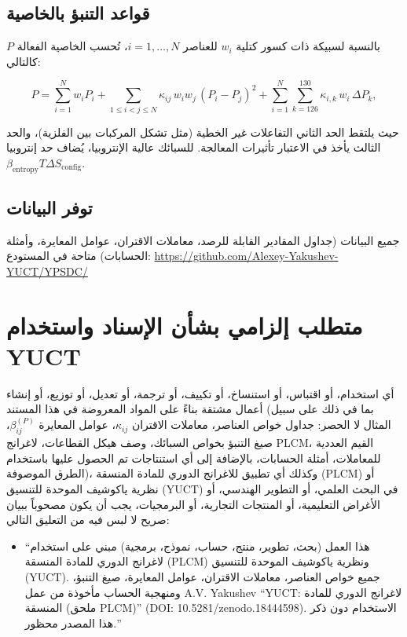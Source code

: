 \documentclass[11pt,a4paper]{article}
\begin{document}
\begin{otherlanguage}{arabic}
		\subsection{قواعد التنبؤ بالخاصية}
		
		بالنسبة لسبيكة ذات كسور كتلية \(w_i\) للعناصر \(i=1,\dots,N\)، تُحسب الخاصية الفعالة \(P\) كالتالي:
		
		\[
		P = \sum_{i=1}^{N} w_i P_i
		+ \sum_{1\le i<j\le N} \kappa_{ij}\, w_i w_j\, (P_i - P_j)^2
		+ \sum_{i=1}^{N} \sum_{k=126}^{130} \kappa_{i,k}\, w_i\, \Delta P_k,
		\]
		
		حيث يلتقط الحد الثاني التفاعلات غير الخطية (مثل تشكل المركبات بين الفلزية)، والحد الثالث يأخذ في الاعتبار تأثيرات المعالجة. للسبائك عالية الإنتروبيا، يُضاف حد إنتروبيا \(\beta_{\text{entropy}} T \Delta S_{\text{config}}\).
		
		\subsection{توفر البيانات}
		
		جميع البيانات (جداول المقادير القابلة للرصد، معاملات الاقتران، عوامل المعايرة، وأمثلة الحسابات) متاحة في المستودع:
		\url{https://github.com/Alexey-Yakushev-YUCT/YPSDC/}
		
		
		\section*{متطلب إلزامي بشأن الإسناد واستخدام YUCT}
		
		أي استخدام، أو اقتباس، أو استنساخ، أو تكييف، أو ترجمة، أو تعديل، أو توزيع، أو إنشاء أعمال مشتقة بناءً على المواد المعروضة في هذا المستند (بما في ذلك على سبيل المثال لا الحصر: جداول خواص العناصر، معاملات الاقتران \(\kappa_{ij}\)، عوامل المعايرة \(\beta_{ij}^{(P)}\)، صيغ التنبؤ بخواص السبائك، وصف هيكل القطاعات، لاغرانج PLCM، القيم العددية للمعاملات، أمثلة الحسابات، بالإضافة إلى أي استنتاجات تم الحصول عليها باستخدام الطرق الموصوفة)، وكذلك أي تطبيق للاغرانج الدوري للمادة المنسقة (PLCM) أو نظرية ياكوشيف الموحدة للتنسيق (YUCT) في البحث العلمي، أو التطوير الهندسي، أو الأغراض التعليمية، أو المنتجات التجارية، أو البرمجيات، يجب أن يكون مصحوباً ببيان صريح لا لبس فيه من التعليق التالي:
		

	\begin{itemize}
		\item {“هذا العمل (بحث، تطوير، منتج، حساب، نموذج، برمجية) مبني على استخدام لاغرانج الدوري للمادة المنسقة (PLCM) ونظرية ياكوشيف الموحدة للتنسيق (YUCT). جميع خواص العناصر، معاملات الاقتران، عوامل المعايرة، صيغ التنبؤ، ومنهجية الحساب مأخوذة من عمل A.V. Yakushev “YUCT: لاغرانج الدوري للمادة المنسقة (ملحق PLCM)” (DOI: 10.5281/zenodo.18444598). الاستخدام دون ذكر هذا المصدر محظور.”}
	\end{itemize}


\end{otherlanguage}
\end{document}
